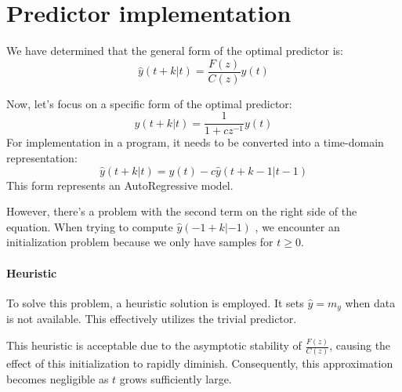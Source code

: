 \section{Predictor implementation}

We have determined that the general form of the optimal predictor is:
\[\hat{y}(t+k|t)=\dfrac{F(z)}{C(z)}y(t)\]

Now, let's focus on a specific form of the optimal predictor:
\[\hat{y}(t+k|t)=\dfrac{1}{1+cz^{-1}}y(t)\]
For implementation in a program, it needs to be converted into a time-domain representation:
\[\hat{y}(t+k|t)=y(t)-c\hat{y}(t+k-1|t-1) \]
This form represents an AutoRegressive model.

However, there's a problem with the second term on the right side of the equation.
When trying to compute $\hat{y}(-1+k|-1)$ , we encounter an initialization problem because we only have samples for $t\geq 0$.

\paragraph*{Heuristic}
To solve this problem, a heuristic solution is employed. 
It sets $\hat{y}=m_y$ when data is not available. 
This effectively utilizes the trivial predictor.

This heuristic is acceptable due to the asymptotic stability of $\frac{F(z)}{C(z)}$, causing the effect of this initialization to rapidly diminish. 
Consequently, this approximation becomes negligible as $t$ grows sufficiently large.